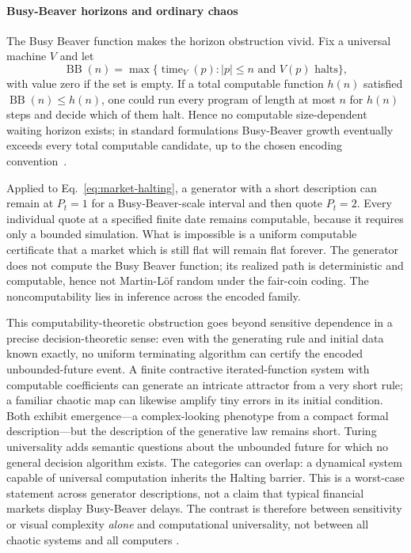 \documentclass[aps,pra,reprint,superscriptaddress,amsmath,amssymb,floatfix]{revtex4-2}
\theoremstyle{plain}
\theoremstyle{definition}
\theoremstyle{remark}
\begin{document}
\paragraph{Busy-Beaver horizons and ordinary chaos}

The Busy Beaver function makes the horizon obstruction vivid. Fix a universal
machine \(V\) and let
\begin{equation}
  \operatorname{BB}(n)
  =
  \max\{\operatorname{time}_V(p):
  |p|\leq n\text{ and }V(p)\text{ halts}\},
  \label{eq:busybeaver}
\end{equation}
with value zero if the set is empty. If a total computable function \(h(n)\)
satisfied \(\operatorname{BB}(n)\leq h(n)\), one could run every program of
length at most \(n\) for \(h(n)\) steps and decide which of them halt. Hence no
computable size-dependent waiting horizon exists; in standard formulations
Busy-Beaver growth eventually exceeds every total computable candidate, up to
the chosen encoding convention~\cite{rado,chaitin-bb}.

Applied to Eq.~\eqref{eq:market-halting}, a generator with a short description
can remain at \(P_t=1\) for a Busy-Beaver-scale interval and then quote
\(P_t=2\). Every individual quote at a specified finite date remains
computable, because it requires only a bounded simulation. What is impossible
is a uniform computable certificate that a market which is still flat will
remain flat forever. The generator does not compute the Busy Beaver function;
its realized path is deterministic and computable, hence not Martin-L\"of
random under the fair-coin coding. The noncomputability lies in inference
across the encoded family.

This computability-theoretic obstruction goes beyond sensitive dependence in a
precise decision-theoretic sense: even with the generating rule and initial
data known exactly, no uniform terminating algorithm can certify the encoded
unbounded-future event. A finite contractive iterated-function system with
computable coefficients can generate an intricate attractor from a very short
rule; a familiar chaotic map can likewise amplify tiny errors in its initial
condition. Both exhibit emergence---a complex-looking phenotype from a compact
formal description---but the description of the generative law remains short.
Turing universality adds semantic questions about the unbounded future for
which no general decision algorithm exists. The categories can overlap: a
dynamical system capable of universal computation inherits the Halting
barrier. This is a worst-case statement across generator descriptions, not a
claim that typical financial markets display Busy-Beaver delays. The contrast
is therefore between sensitivity or visual complexity \emph{alone} and
computational universality, not between all chaotic systems and all computers
\cite{barnsley:88,moore,calude:037103}.
\end{document}
